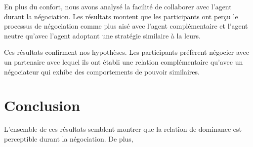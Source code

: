 	En plus du confort, nous avons analysé la facilité de collaborer avec l'agent durant la négociation. Les résultats montent que les participants ont perçu le processus de négociation comme plus aisé avec l'agent complémentaire et l'agent neutre qu'avec l'agent adoptant une stratégie similaire à la leurs. 
	
	Ces résultats confirment nos hypothèses. Les participants préfèrent négocier avec un partenaire avec lequel ils ont établi une relation complémentaire qu'avec un négociateur qui exhibe des comportements de pouvoir similaires. 

	\section{Conclusion}

L'ensemble de ces résultats semblent montrer que la relation de dominance est perceptible durant la négociation. De plus, 